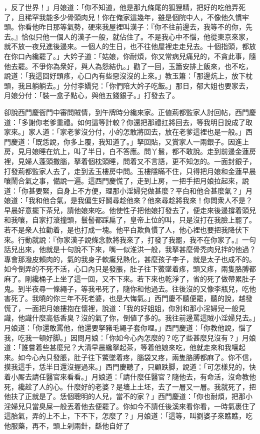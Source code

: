 ，反了世界！」月娘道：「你不知道，他是那九條尾的狐狸精，把好的吃他弄死了，且稀罕我能多少骨頭肉兒！你在俺家這幾年，雖是個院中人，不像他久慣牢頭。你看他昨日那等氣勢，硬來我屋裡叫漢子：『你不往前邊去，我等不的你，先去。』恰似只他一個人的漢子一般，就佔住了。不是我心中不惱，他從東京來家，就不放一夜兒進後邊來。一個人的生日，也不往他屋裡走走兒去。十個指頭，都放在你口內纔罷了。」{}大妗子道：「姑娘，你耐煩，你又常病兒痛兒的，不貪此事，隨他去罷。不爭你為衆好，與人為怨結仇。」勸了一回，玉簫安排上飯來，也不吃，說道：「我這回好頭疼，心口內有些惡沒沒的上來。」教玉簫：「那邊炕上，放下枕頭，我且躺躺去。」分付李嬌兒：「你們陪大妗子吃飯。」那日，郁大姐也要家去，月娘分付：「裝一盒子點心，與他五錢銀子。」打發去了。

卻說西門慶衙門中審問賊情，到午牌時分纔來家。正値荊都監家人討回帖，西門慶道：「多謝你老爹重禮。如何這等計較？你還把那禮扛將回去，等我明日說成了取家來。」家人道：「家老爹沒分付，小的怎敢將回去，放在老爹這裡也是一般。」西門慶道：「既恁說，你多上覆，我知道了。」拏回貼，又賞家人一兩銀子。因進上房，見月娘睡在炕上，叫了半日，白不答應。問丫鬟，都不敢說。走到前邊金蓮房裡，見婦人蓬頭撒腦，拏着個枕頭睡，問着又不言語，更不知怎的。一面封銀子，打發荊都監家人去了，走到孟玉樓房中問。玉樓隱瞞不住，只得把月娘和金蓮早晨嚷鬧合氣之事，備說一遍。這西門慶慌了，走到上房，一把手把月娘拉起來，說道：「你甚要緊，自身上不方便，理那小淫婦兒做甚麼？平白和他合甚麼氣？」月娘道：「我和他合氣，是我偏生好鬬尋趁他來？他來尋趁將我來！你問衆人不是？早晨好意擺下茶兒，請他娘來吃。他使性子把他娘打發去了，便走來後邊撐着頭兒和我嚷，自家打滾撞頭，鬟髻都踩扁了，皇帝上位的叫，只是沒打在我臉上罷了。若不是衆人拉勸着，是也打成一塊。他平白欺負慣了人，他心裡也要把我降伏下來。行動就說：『你家漢子說條念款將我來了，打發了我罷，我不在你家了。』一句話兒出來，他就是十句說不下來，嘴一似淮洪一般，我拏甚麼骨禿肉兒拌的他過？專會那潑皮賴肉的，氣的我身子軟癱兒熱化，甚麼孩子李子，就是太子也成不的。如今倒弄的不死不活，心口內只是發脹，肚子往下鱉墜着疼，頭又疼，兩隻胳膊都麻了。剛纔桶子上坐了這一回，又不下來。若下來也乾淨了，省的死了做帶累肚子鬼。到半夜尋一條繩子，等我弔死了，隨你和他過去。往後沒的又像李瓶兒，吃他害死了。{}我曉的你三年不死老婆，也是大悔氣。」西門慶不聽便罷，聽的說，越發慌了，一面把月娘摟抱在懷裡，說道：「我的好姐姐，你別和那小淫婦兒一般見識，他識什麼高低香臭？沒的氣了你，倒値了多的。我往前邊罵這賊小淫婦兒去。」月娘道：「你還敢罵他，他還要拏豬毛繩子套你哩。」西門慶道：「你教他說，惱了我，吃我一頓好脚。」因問月娘：「你如今心內怎麼的？吃了些甚麼兒沒有？」月娘道：「誰嘗着些甚麼兒？大清早晨纔拏起茶，等着他娘來吃，他就走來和我嚷起來。如今心內只發脹，肚子往下鱉墜着疼，腦袋又疼，兩隻胳膊都麻了。你不信，摸我這手，恁半日還沒握過來。」西門慶聽了，只顧跌脚，說道：「可怎樣兒的，快着小厮去請任醫官來看看。」月娘道：「請什麼任醫官？隨他去，有命活，沒命教他死，纔趁了人的心。什麼好的老婆？是墻上土坯，去了一層又一層。我就死了，把他扶了正就是了。恁個聰明的人兒，當不的家？」西門慶道：「你也耐煩，把那小淫婦兒只當臭屎一般丟着他去便罷了。你如今不請任後溪來看你看，一時氣裹住了這胎氣，弄的上不上，下不下，怎麼了？」月娘道：「這等，叫劉婆子來瞧瞧，吃他服藥，再不，頭上剁兩針，繇他自好了